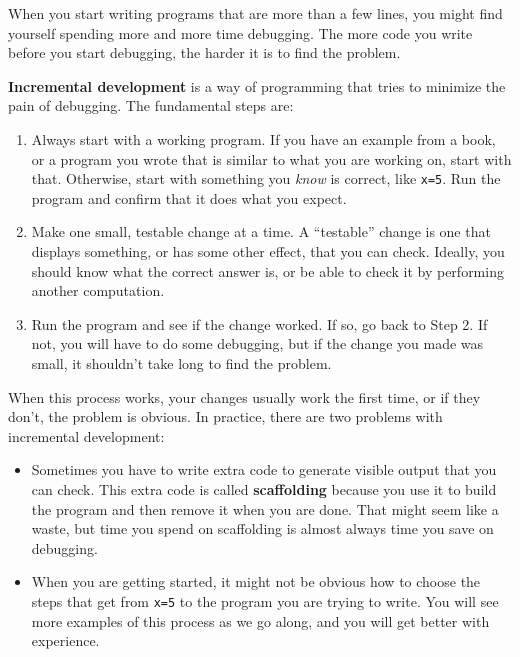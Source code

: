 \documentclass[12pt]{book}
\theoremstyle{exercise}
\begin{document}
When you start writing programs that are more than a few lines, you
might find yourself spending more and more time debugging.  The more
code you write before you start debugging, the harder it is to find
the problem.

{\bf Incremental development} is a way of programming that tries
to minimize the pain of debugging.  The fundamental steps are:

\begin{enumerate}

\item Always start with a working program.  If you have an
example from a book, or a program you wrote that is similar to
what you are working on, start with that.  Otherwise, start with
something you {\em know} is correct, like {\tt x=5}.  Run the program
and confirm that it does what you expect.

\item Make one small, testable change at a time.  A ``testable''
change is one that displays something, or has some
other effect, that you can check.  Ideally, you should know what
the correct answer is, or be able to check it by performing another
computation. 

\item Run the program and see if the change worked.  If so, go back
to Step 2.  If not, you will have to do some debugging, but if the
change you made was small, it shouldn't take long to find the problem.

\end{enumerate}

When this process works, your changes usually work the first time, or if they don't, the problem is obvious.  In practice, there are two problems with incremental development:

\begin{itemize}

\item Sometimes you have to write extra code to generate visible output that you can check.  This extra code is called {\bf scaffolding} because you use it to build the program and then remove it when you are done.  That might seem like a waste, but time you spend on scaffolding is almost always time you save on debugging.

\item When you are getting started, it might not be obvious how to
choose the steps that get from {\tt x=5} to the program you are trying
to write.  You will see more examples of this process as we go along, and you will get better with experience.

\end{itemize}
\end{document}
